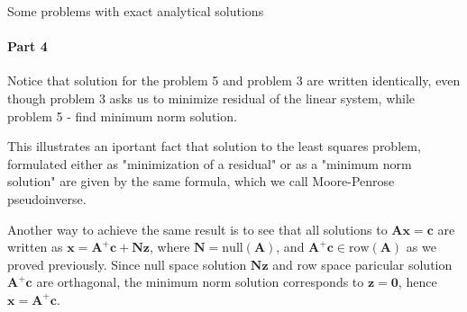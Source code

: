 \documentclass{beamer}
\begin{document}
\begin{frame}{Some problems with exact analytical solutions}
\framesubtitle{Part 4}
\begin{flushleft}

Notice that solution for the problem 5 and problem 3 are written identically, even though problem 3 asks us to minimize residual of the linear system, while problem 5 - find minimum norm solution. 

\bigskip

This illustrates an iportant fact that solution to the least squares problem, formulated either as "minimization of a residual" or as a "minimum norm solution" are given by the same formula, which we call Moore-Penrose pseudoinverse.

\bigskip

Another way to achieve the same result is to see that all solutions to $\mathbf{A} \mathbf{x} = \mathbf{c}$ are written as $\mathbf{x} = \mathbf{A}^+\mathbf{c} + \mathbf{N}\mathbf{z}$, where $\mathbf{N} = \text{null}(\mathbf{A})$, and $\mathbf{A}^+\mathbf{c} \in \text{row}(\mathbf{A})$ as we proved previously. Since null space solution $\mathbf{N}\mathbf{z}$ and row space paricular solution $\mathbf{A}^+\mathbf{c}$ are orthagonal, the minimum norm solution corresponds to $\mathbf{z} = \mathbf{0}$, hence $\mathbf{x} = \mathbf{A}^+\mathbf{c}$.

\end{flushleft}
\end{frame}
\end{document}
